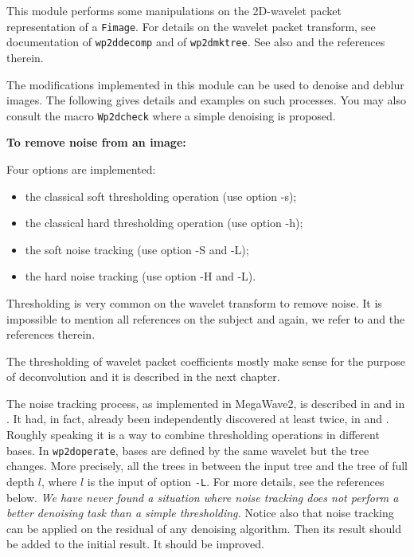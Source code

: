 This module performs some manipulations on the 2D-wavelet packet
representation of a \verb+Fimage+. For details on the wavelet packet transform,
see documentation of \verb+wp2ddecomp+ and of \verb+wp2dmktree+.
See also \cite{mallat:wavelet} and the references therein.

The modifications implemented in this module can be used to 
denoise and deblur
images. 
The following gives details and examples on such processes.
You may also consult the macro \verb+Wp2dcheck+ where a simple denoising
is proposed.

\medskip

{\bf {\large To remove noise from an image:}} 

Four options are implemented:
\begin{itemize}
  \item the classical soft thresholding operation (use option -s);
  \item the classical hard thresholding operation (use option -h);
  \item the soft noise tracking (use option -S and -L);
  \item the hard noise tracking (use option -H and -L).
  \end{itemize}

Thresholding is very common on the wavelet transform to remove
noise. 
It is impossible to mention all references on the subject
and again, we refer to \cite{mallat:wavelet} and the references therein.

The thresholding of wavelet packet coefficients mostly make sense for
the purpose of deconvolution and it is described in the next chapter.

The noise tracking process, as implemented 
in MegaWave2, is described in \cite{malgouyres:noise} and in
\cite{malgouyres:noise*1}. 
It had, in fact, already been independently discovered at least twice, in
\cite{woog:adapted} and  \cite{ishwar.moulin:multiple-domain}. 
Roughly speaking it is a way to combine thresholding operations in different bases. 
In \verb+wp2doperate+, bases are defined by the same wavelet but the
tree changes. More precisely, all the trees in between the input tree
and the tree of full depth $l$, where $l$ is the input of option \verb+-L+. 
For more details, see the references below. 
{\em We have never found a situation where noise tracking does not perform a better 
denoising task than a simple thresholding.} 
Notice also that noise tracking can be applied on the residual of any denoising 
algorithm. Then its result should be added to the initial result. It should be improved.

